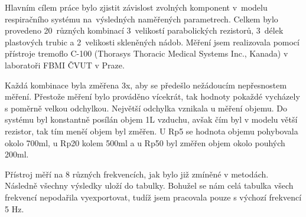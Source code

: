 Hlavním cílem práce bylo zjistit závislost zvolných komponent v~modelu respiračního systému na~výsledných naměřených parametrech.  Celkem bylo provedeno 20~různých kombinací 3~velikostí parabolických rezistorů, 3~délek plastových trubic a 2~velikosti skleněných nádob. Měření jsem realizovala pomocí přístroje tremoflo C-100 (Thorasys Thoracic Medical Systems Inc., Kanada) v laboratoři FBMI ČVUT v Praze. 

Každá kombinace byla změřena 3x, aby se předešlo nežádoucím nepřesnostem měření. Přestože měření bylo prováděno vícekrát, tak hodnoty pokaždé vycházely s poměrně velkou odchylkou. Největší odchylka vznikala u měření objemu. Do systému byl konstantně posílán objem 1L vzduchu, avšak čím byl v modelu větší rezistor, tak tím meněí objem byl změřen. U Rp5 se hodnota objemu pohybovala okolo 700ml, u Rp20 kolem 500ml a u Rp50 byl změřen objem okolo pouhých 200ml.

Přístroj měří na 8 různých frekvencích, jak bylo již zmíněné v metodách. Následně všechny výsledky uloží do tabulky. Bohužel se nám celá tabulka všech frekvencí nepodařila vyexportovat, tudíž jsem pracovala pouze s výchozí frekvencí 5 Hz. 
